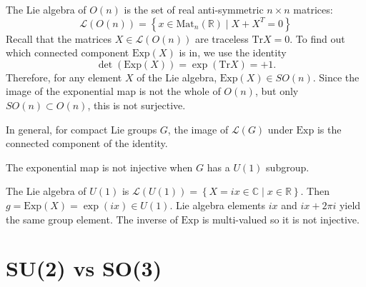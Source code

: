 \begin{example}[$G= O(n)$]
  The Lie algebra of $O(n)$ is the set of real anti-symmetric $n \times n$ matrices:
  \begin{equation}
    \mathscr{L}(O(n)) = \left\{ x \in \text{Mat}_n(\mathbb{R}) \mid X + X^T = 0 \right\}
  \end{equation}
  Recall that the matrices $X \in \mathscr{L}(O(n))$ are traceless $\text{Tr} X = 0$.
  To find out which connected component $\text{Exp}(X)$ is in, we use the identity
  \begin{equation}
    \det(\text{Exp}(X)) = \exp(\text{Tr}X) = +1.
  \end{equation}
  Therefore, for any element $X$ of the Lie algebra, $\text{Exp}(X) \in SO(n)$. Since the image of the exponential map is not the whole of $O(n)$, but only $SO(n) \subset O(n)$, this is not surjective.
\end{example}
\begin{claim}
  In general, for compact Lie groups $G$, the image of $\mathscr{L}(G)$ under $\text{Exp}$ is the connected component of the identity.
\end{claim}
\begin{claim}
  The exponential map is not injective when $G$ has a $U(1)$ subgroup.
\end{claim}
\begin{example}[$G = U(1)$]
  The Lie algebra of $U(1)$ is $\mathscr{L}(U(1)) = \left\{ X = ix \in \mathbb{C} \mid x \in \mathbb{R} \right\}$. Then $g = \text{Exp}(X) = \exp(ix) \in U(1)$. Lie algebra elements $ix$ and $ix + 2 \pi i$ yield the same group element.
  The inverse of $\text{Exp}$ is multi-valued so it is not injective.
\end{example}

\section{SU(2) vs SO(3)}%
\label{sec:su_2_vs_so_3_}


